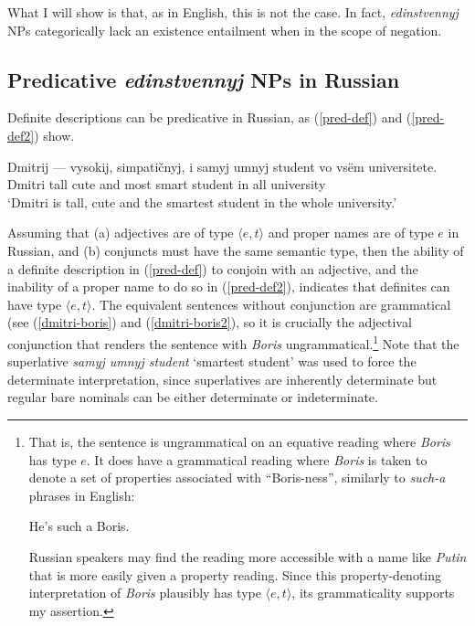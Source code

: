 What I will show is that, as in English, this is not the case. In fact, \textit{edinstvennyj} NPs categorically lack an existence entailment when in the scope of negation.

\subsection{Predicative \textit{edinstvennyj} NPs in Russian}
Definite descriptions can be predicative in Russian, as (\ref{pred-def}) and (\ref{pred-def2}) show.

\begin{exe}
	\ex \label{pred-def} \gll Dmitrij --- vysokij, simpati\v{c}nyj, i samyj umnyj student vo vs\"{e}m universitete.\\
	Dmitri {} tall cute and most smart student in all university\\
	\glt `Dmitri is tall, cute and the smartest student in the whole university.'

\end{exe}

Assuming that (a) adjectives are of type $\langle e, t \rangle$ and proper names are of type $e$ in Russian, and (b) conjuncts must have the same semantic type, then the ability of a definite description in (\ref{pred-def}) to conjoin with an adjective, and the inability of a proper name to do so in (\ref{pred-def2}), indicates that definites can have type $\langle e, t \rangle$. The equivalent sentences without conjunction are grammatical (see (\ref{dmitri-boris}) and (\ref{dmitri-boris2}), so it is crucially the adjectival conjunction that renders the sentence with \textit{Boris} ungrammatical.\footnote{That is, the sentence is ungrammatical on an equative reading where \textit{Boris} has type $e$. It does have a grammatical reading where \textit{Boris} is taken to denote a set of properties associated with ``Boris-ness'', similarly to \textit{such-a} phrases in English: \begin{exe} \ex He's such a Boris.\end{exe} Russian speakers may find the reading more accessible with a name like \textit{Putin} that is more easily given a property reading. Since this property-denoting interpretation of \textit{Boris} plausibly has type $\langle e, t \rangle$, its grammaticality supports my assertion.} Note that the superlative \textit{samyj umnyj student} `smartest student' was used to force the determinate interpretation, since superlatives are inherently determinate but regular bare nominals can be either determinate or indeterminate.

